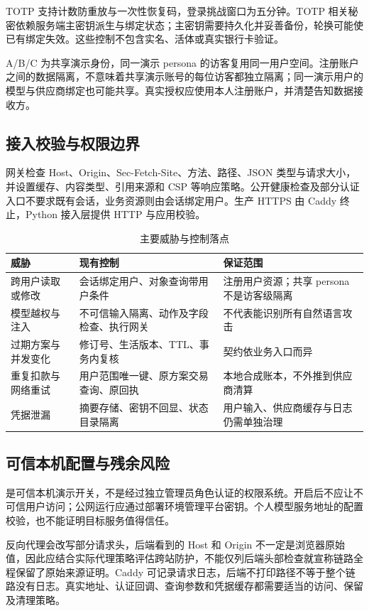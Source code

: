 TOTP 支持计数防重放与一次性恢复码，登录挑战窗口为五分钟。TOTP 相关秘密依赖服务端主密钥派生与绑定状态；主密钥需要持久化并妥善备份，轮换可能使已有绑定失效。这些控制不包含实名、活体或真实银行卡验证。

A/B/C 为共享演示身份，同一演示 persona 的访客复用同一用户空间。注册账户之间的数据隔离，不意味着共享演示账号的每位访客都独立隔离；同一演示用户的模型与供应商绑定也可能共享。真实授权应使用本人注册账户，并清楚告知数据接收方。

\subsection{接入校验与权限边界}
网关检查 Host、Origin、Sec-Fetch-Site、方法、路径、JSON 类型与请求大小，并设置缓存、内容类型、引用来源和 CSP 等响应策略。公开健康检查及部分认证入口不要求既有会话，业务资源则由会话绑定用户。生产 HTTPS 由 Caddy 终止，Python 接入层提供 HTTP 与应用校验。

\begin{table}[htbp]\centering\small
\caption{主要威胁与控制落点}
\begin{tabularx}{\textwidth}{@{}L{2.5cm}YY@{}}\toprule
威胁 & 现有控制 & 保证范围 \\\midrule
跨用户读取或修改 & 会话绑定用户、对象查询带用户条件 & 注册用户资源；共享 persona 不是访客级隔离 \\
模型越权与注入 & 不可信输入隔离、动作及字段检查、执行网关 & 不代表能识别所有自然语言攻击 \\
过期方案与并发变化 & 修订号、生活版本、TTL、事务内复核 & 契约依业务入口而异 \\
重复扣款与网络重试 & 用户范围唯一键、原方案交易查询、原回执 & 本地合成账本，不外推到供应商清算 \\
凭据泄漏 & 摘要存储、密钥不回显、状态目录隔离 & 用户输入、供应商缓存与日志仍需单独治理 \\\bottomrule
\end{tabularx}
\end{table}

\subsection{可信本机配置与残余风险}
 是可信本机演示开关，不是经过独立管理员角色认证的权限系统。开启后不应让不可信用户访问；公网运行应通过部署环境管理平台密钥。个人模型服务地址的配置校验，也不能证明目标服务值得信任。

反向代理会改写部分请求头，后端看到的 Host 和 Origin 不一定是浏览器原始值，因此应结合实际代理策略评估跨站防护，不能仅列后端头部检查就宣称链路全程保留了原始来源证明。Caddy 可记录请求日志，后端不打印路径不等于整个链路没有日志。真实地址、认证回调、查询参数和凭据缓存都需要适当的访问、保留及清理策略。
